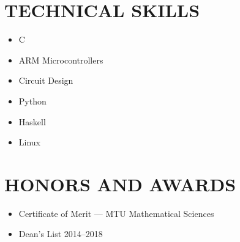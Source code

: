 \documentclass[letterpaper]{res}
\begin{document}
\begin{resume}
  \section{TECHNICAL SKILLS}
  \vspace{-1pt}
  \begin{multicols}{3}
    \begin{itemize} \itemsep1pt \parskip0pt 
      \item C
      \item ARM Microcontrollers
      \item Circuit Design
      \item Python
      \item Haskell
      \item Linux
    \end{itemize}
  \end{multicols}

  \section{HONORS AND AWARDS}
  \begin{itemize}
    \item Certificate of Merit --- MTU Mathematical Sciences
    \item Dean's List 2014--2018
  \end{itemize}

\end{resume}
\end{document}

